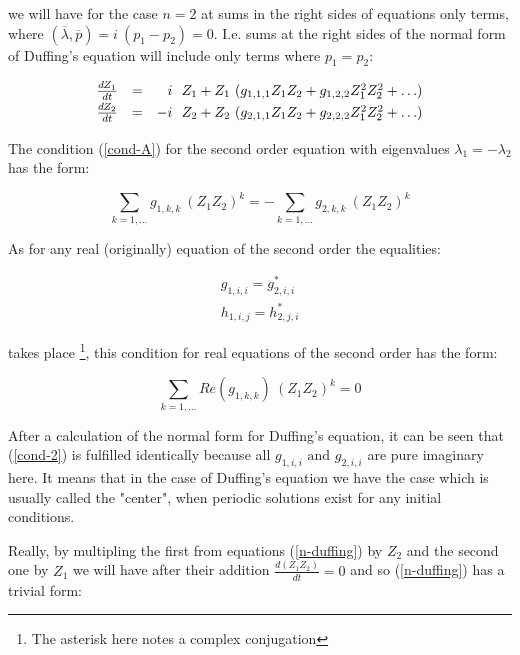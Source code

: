 \noindent
we will have for the case $n = 2$ 
at sums in the right sides of equations only terms, where 
$(\overline{\lambda},\overline{p}) = i\ (p_1 - p_2) = 0$.
I.e. sums at the right sides of the normal form of Duffing's 
equation will include only terms where $p_1 = p_2$: 

\begin{equation}
\label{n-duffing}
\begin{array}{lcrl}
\frac{\mathstrut dZ_1}{\mathstrut dt}& = &  i &\!\! Z_1 
+ Z_1\ (g_{1,1,1} Z_1 Z_2 + g_{1,2,2} Z_{1}^2 Z_{2}^2 + \ldots)\\
\frac{\mathstrut dZ_2}{\mathstrut dt}& = & -i &\!\! Z_2
+ Z_2\ (g_{2,1,1} Z_1 Z_2 + g_{2,2,2} Z_{1}^2 Z_{2}^2 + \ldots)
\end{array}
\end{equation}

The condition (\ref{cond-A}) for the second order equation with 
eigenvalues $\lambda_1 = -\lambda_2$ has the form:


$$
\sum_{k=1,\ldots} g_{1,k,k} \ (Z_1 Z_2)^k = 
- \sum_{k=1,\ldots} g_{2,k,k} \ (Z_1 Z_2)^k
$$

As for any real (originally) equation of the second order the equalities:

\begin{equation}
\label{conj-2}
\begin{array}{c}
g_{1,i,i} = g_{2,i,i}^{*}\\
h_{1,i,j} = h_{2,j,i}^{*}
\end{array}
\end{equation}

takes place \footnote{The asterisk here notes a complex conjugation},
this condition for real equations of the second order has the form:

\begin{equation}
\label{cond-2}
\sum_{k=1,\ldots} Re(g_{1,k,k}) \ (Z_1 Z_2)^k = 0
\end{equation}

After a calculation of the normal form for Duffing's equation,
it can be seen that (\ref{cond-2}) is fulfilled identically
because all $g_{1,i,i} \mbox{ and } g_{2,i,i}$ are pure imaginary here. 
It means that in the case of Duffing's equation we have the
case which is usually  called the "center", when 
periodic solutions exist for any initial conditions.

Really, 
by multipling the first from equations (\ref{n-duffing}) by $Z_2$
and the second one by $Z_1$ we will have after their addition 
$\frac{d(Z_1 Z_2)}{dt} = 0$ and so (\ref{n-duffing}) has a trivial
form:

